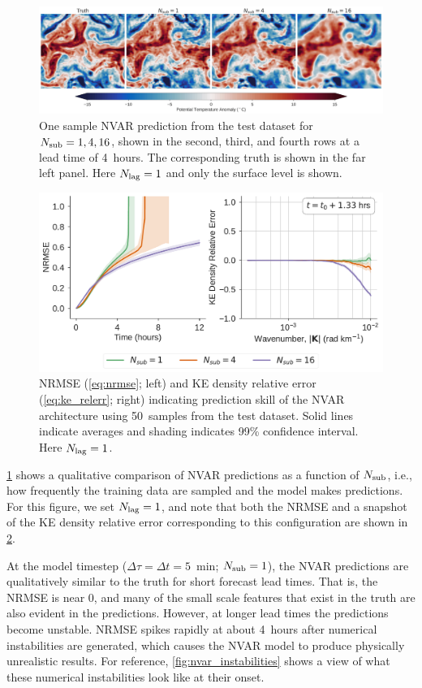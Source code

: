 \begin{figure}
    \centering
    \includegraphics[width=\textwidth]{../figures/nvar_4hr_snap.jpg}
    \caption{One sample NVAR prediction from the test dataset for $N_\text{sub} =
        1,4,16$, shown in the second, third, and fourth rows at a lead time of 4~hours.
        The corresponding truth is shown in the far left panel.
        Here $N_\text{lag}=1$ and only the surface level is shown.
    }
    \label{fig:nvar_qualitative}
\end{figure}

\begin{figure}
    \centering
    \includegraphics[width=.8\textwidth]{../figures/nvar-nrmse-and-kere.pdf}
    \caption{NRMSE (\cref{eq:nrmse}; left) and KE density
        relative error (\cref{eq:ke_relerr}; right)
        indicating prediction skill of the NVAR
        architecture using 50~samples from the test dataset.
        Solid lines indicate averages and shading indicates 99\% confidence
        interval.
        Here $N_\text{lag}=1$.
    }
    \label{fig:nvar_nrmse}
\end{figure}

\cref{fig:nvar_qualitative} shows a qualitative comparison of NVAR predictions
as a function of $N_\text{sub}$, i.e., how frequently the training data are sampled and
the model makes predictions.
For this figure, we set $N_\text{lag}=1$, and note that both the NRMSE and a snapshot
of the KE density relative error corresponding to this configuration are shown in
\cref{fig:nvar_nrmse}.

At the model timestep ($\Delta \tau = \Delta t = 5$~min; $N_\text{sub}=1$), the NVAR predictions are
qualitatively similar to the truth for short forecast lead times.
That is, the NRMSE is near 0, and
many of the small scale features that exist in the truth are also evident
in the predictions.
However, at longer lead times the predictions become unstable.
NRMSE spikes rapidly at about 4~hours after numerical instabilities are
generated, which causes the NVAR model to produce physically unrealistic results.
For reference, \cref{fig:nvar_instabilities} shows a view of what these
numerical instabilities look like at their onset.

